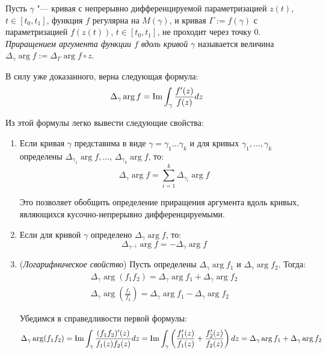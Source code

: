 \begin{definition}
	Пусть $\gamma$ "--- кривая с непрерывно дифференцируемой параметризацией $z(t)$, $t \in [t_0, t_1]$, функция $f$ регулярна на $M(\gamma)$, и кривая $\Gamma := f(\gamma)$ с параметризацией $f(z(t))$, $t \in [t_0, t_1]$, не проходит через точку $0$. \textit{Приращением аргумента функции $f$ вдоль кривой} $\gamma$ называется величина $\Delta_\gamma\arg{f} := \Delta_\Gamma\arg{f \circ z}$.
\end{definition}

\begin{note}
	В силу уже доказанного, верна следующая формула:
	\[\Delta_\gamma\arg{f} = \operatorname{Im}\int_\gamma \frac{f'(z)}{f(z)}dz\]
	
	Из этой формулы легко вывести следующие свойства:
	\begin{enumerate}
		\item Если кривая $\gamma$ представима в виде $\gamma = \gamma_1\dotsc \gamma_k$ и для кривых $\gamma_1, \dotsc, \gamma_k$ определены $\Delta_{\gamma_1}\arg f, \dotsc$, $\Delta_{\gamma_k}\arg f$, то:
		\[\Delta_{\gamma}\arg f = \sum_{i = 1}^k\Delta_{\gamma_i}\arg f\]
		
		Это позволяет обобщить определение приращения аргумента вдоль кривых, являющихся кусочно-непрерывно дифференцируемыми.

		\item Если для кривой $\gamma$ определено $\Delta_{\gamma}\arg f$, то:
		\[\Delta_{\gamma^{-1}}\arg f = -\Delta_{\gamma}\arg f\]
		
		\item (\textit{Логарифмическое свойство}) Пусть определены $\Delta_{\gamma}\arg f_1$ и $\Delta_{\gamma}\arg f_2$. Тогда:
		\begin{gather*}
			\Delta_{\gamma}\arg (f_1f_2) = \Delta_{\gamma}\arg f_1 + \Delta_{\gamma}\arg f_2
			\\
			\Delta_{\gamma}\arg \left(\frac{f_1}{f_2}\right) = \Delta_{\gamma}\arg f_1 - \Delta_{\gamma}\arg f_2
		\end{gather*}
	
		Убедимся в справедливости первой формулы:
		\[\Delta_{\gamma}\arg (f_1f_2) =  \operatorname{Im}\int_\gamma \frac{(f_1f_2)'(z)}{f_1(z)f_2(z)}dz = \operatorname{Im}\int_\gamma \left(\frac{f_1'(z)}{f_1(z)} + \frac{f_2'(z)}{f_2(z)}\right)dz = \Delta_{\gamma}\arg f_1 + \Delta_{\gamma}\arg f_2\]

	\end{enumerate}
\end{note}